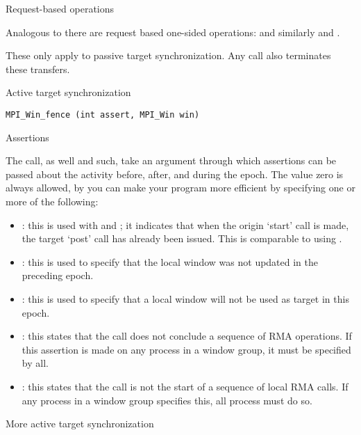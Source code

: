  {Request-based operations}

Analogous to  there are request based one-sided operations:
%
%
and similarly  and .

These only apply to passive target synchronization.
Any  call also terminates these transfers.

 {Active target synchronization}

\begin{verbatim}
MPI_Win_fence (int assert, MPI_Win win)
\end{verbatim}

 {Assertions}
\label{sec:mpi-assert}

The  call, as well  and such, take an argument
through which assertions can be passed about the activity before, after, and during the epoch.
The value zero is always allowed, by you can make your program more efficient by specifying
one or more of the following:
\begin{itemize}
\item {}: this is used with
   and ; it
  indicates that when the origin `start' call is made, the target
  `post' call has already been issued. This is comparable to using
  .
\item {}: this is used to specify that
  the local window was not updated in the preceding epoch.
\item {}: this is used to specify that a local
  window will not be used as target in this epoch.
\item {}: this states that the
   call does not conclude a sequence of
  RMA operations. If this assertion is made on any process in a window group,
  it must be specified by all.
\item {}: this states that the
   call is not the start of a sequence of
  local RMA calls. If any process in a window group specifies this,
  all process must do so.
\end{itemize}

 {More active target synchronization}

